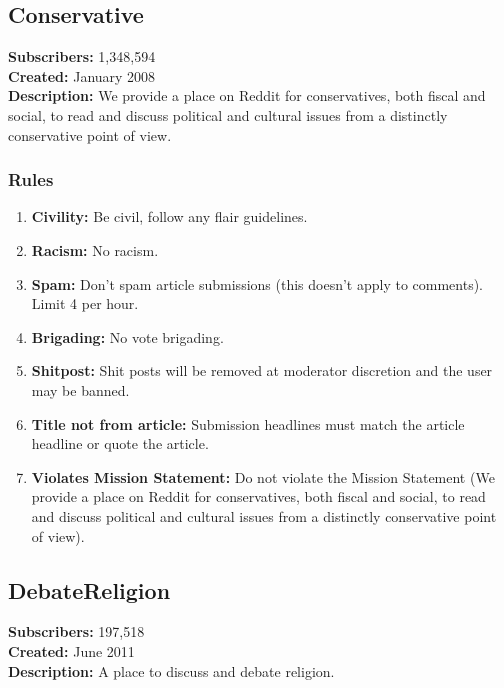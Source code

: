 \subsection{Conservative}
\textbf{Subscribers:} 1,348,594 \\
\textbf{Created:} January 2008 \\
\textbf{Description:} We provide a place on Reddit for conservatives, both fiscal and social, to read and discuss political and cultural issues from a distinctly conservative point of view.

\subsubsection{Rules}
\begin{enumerate}
    \item \textbf{Civility:} Be civil, follow any flair guidelines.
    
    \item \textbf{Racism:} No racism.
    
    \item \textbf{Spam:} Don't spam article submissions (this doesn't apply to comments). Limit 4 per hour.
    
    \item \textbf{Brigading:} No vote brigading.
    
    \item \textbf{Shitpost:} Shit posts will be removed at moderator discretion and the user may be banned.
    
    \item \textbf{Title not from article:} Submission headlines must match the article headline or quote the article.
    
    \item \textbf{Violates Mission Statement:} Do not violate the Mission Statement (We provide a place on Reddit for conservatives, both fiscal and social, to read and discuss political and cultural issues from a distinctly conservative point of view).
\end{enumerate}

\subsection{DebateReligion}
\textbf{Subscribers:} 197,518 \\
\textbf{Created:} June 2011 \\
\textbf{Description:} A place to discuss and debate religion.


